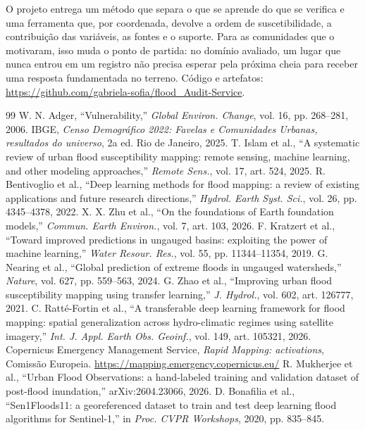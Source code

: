 \documentclass[conference]{IEEEtran}
\begin{document}
O projeto entrega um método que separa o que se aprende do que se verifica e uma ferramenta que, por coordenada, devolve a ordem de suscetibilidade, a contribuição das variáveis, as fontes e o suporte. Para as comunidades que o motivaram, isso muda o ponto de partida: no domínio avaliado, um lugar que nunca entrou em um registro não precisa esperar pela próxima cheia para receber uma resposta fundamentada no terreno. Código e artefatos: \url{https://github.com/gabriela-sofia/flood_Audit-Service}.

\begin{thebibliography}{99}
 W. N. Adger, “Vulnerability,” \emph{Global Environ. Change}, vol. 16, pp. 268--281, 2006.
 IBGE, \emph{Censo Demográfico 2022: Favelas e Comunidades Urbanas, resultados do universo}, 2a ed. Rio de Janeiro, 2025.
 T. Islam et al., “A systematic review of urban flood susceptibility mapping: remote sensing, machine learning, and other modeling approaches,” \emph{Remote Sens.}, vol. 17, art. 524, 2025.
 R. Bentivoglio et al., “Deep learning methods for flood mapping: a review of existing applications and future research directions,” \emph{Hydrol. Earth Syst. Sci.}, vol. 26, pp. 4345--4378, 2022.
 X. X. Zhu et al., “On the foundations of Earth foundation models,” \emph{Commun. Earth Environ.}, vol. 7, art. 103, 2026.
 F. Kratzert et al., “Toward improved predictions in ungauged basins: exploiting the power of machine learning,” \emph{Water Resour. Res.}, vol. 55, pp. 11344--11354, 2019.
 G. Nearing et al., “Global prediction of extreme floods in ungauged watersheds,” \emph{Nature}, vol. 627, pp. 559--563, 2024.
 G. Zhao et al., “Improving urban flood susceptibility mapping using transfer learning,” \emph{J. Hydrol.}, vol. 602, art. 126777, 2021.
 C. Ratté-Fortin et al., “A transferable deep learning framework for flood mapping: spatial generalization across hydro-climatic regimes using satellite imagery,” \emph{Int. J. Appl. Earth Obs. Geoinf.}, vol. 149, art. 105321, 2026.
 Copernicus Emergency Management Service, \emph{Rapid Mapping: activations}, Comissão Europeia. \url{https://mapping.emergency.copernicus.eu/}
 R. Mukherjee et al., “Urban Flood Observations: a hand-labeled training and validation dataset of post-flood inundation,” arXiv:2604.23066, 2026.
 D. Bonafilia et al., “Sen1Floods11: a georeferenced dataset to train and test deep learning flood algorithms for Sentinel-1,” in \emph{Proc. CVPR Workshops}, 2020, pp. 835--845.

\end{thebibliography}
\end{document}
